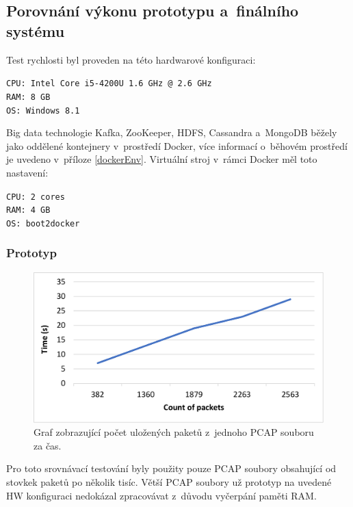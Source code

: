 \subsection{Porovnání výkonu prototypu a~finálního systému}
Test rychlosti byl proveden na této hardwarové konfiguraci:

\vspace{0.5cm}
\noindent \texttt{CPU: Intel Core i5-4200U 1.6 GHz @ 2.6 GHz} \\
\texttt{RAM: 8 GB} \\
\texttt{OS: Windows 8.1}

\vspace{0.5cm}
\noindent Big data technologie Kafka, ZooKeeper, HDFS, Cassandra a~MongoDB běžely jako oddělené kontejnery v~prostředí Docker, více informací o~běhovém prostředí je uvedeno v~příloze \ref{dockerEnv}. Virtuální stroj v~rámci Docker měl toto nastavení:

\vspace{0.5cm}
\noindent \texttt{CPU: 2 cores} \\
\texttt{RAM: 4 GB} \\
\texttt{OS: boot2docker}

\subsubsection{Prototyp}

\begin{figure}[!h]
    \centering
    \includegraphics[width=15cm]{template-fig/PrototypePerformanceChart.pdf}
    \caption{Graf zobrazující počet uložených paketů z~jednoho PCAP souboru za čas.}
    \label{FIG_PerformanceChartPrototype}
\end{figure}

\noindent Pro toto srovnávací testování byly použity pouze PCAP soubory obsahující od stovkek paketů po několik tisíc. Větší PCAP soubory už prototyp na uvedené HW konfiguraci nedokázal zpracovávat z~důvodu vyčerpání paměti RAM.

